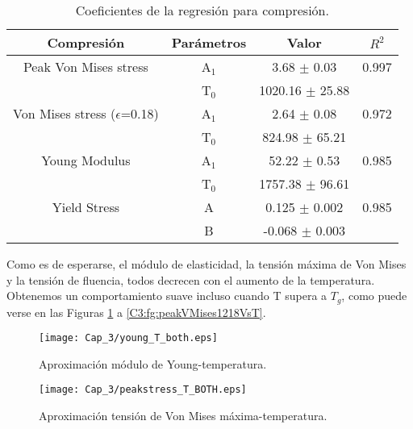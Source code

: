 \begin{table}[htp]
\begin{center}
\begin{tabular}{*{4}{c}}
\hline
\textbf{Compresión} & Parámetros & Valor & $R^{2}$ \\ \hline \hline
Peak Von Mises stress & A$_{1}$ & 3.68 $\pm$ 0.03 & 0.997 \\
 & T$_{0}$ & 1020.16 $\pm$ 25.88 & \\ \hline
Von Mises stress ($\epsilon$=0.18) & A$_{1}$ & 2.64 $\pm$ 0.08 & 0.972 \\
 & T$_{0}$ & 824.98 $\pm$ 65.21 & \\ \hline
Young Modulus & A$_{1}$ & 52.22 $\pm$ 0.53 & 0.985 \\
 & T$_{0}$ & 1757.38 $\pm$ 96.61 & \\ \hline
Yield Stress & A & 0.125 $\pm$ 0.002 & 0.985 \\
 & B & -0.068 $\pm$ 0.003 & \\ \hline
\end{tabular}
\end{center}
\caption[Coeficientes de la regresión para compresión]{Coeficientes de la regresión para compresión.}
\label{C3:tb:initPropsComp}
\end{table}

Como es de esperarse, el módulo de elasticidad, la tensión máxima de Von Mises y la tensión de fluencia, todos decrecen con el aumento de la temperatura. Obtenemos un comportamiento suave incluso cuando T supera a $T_g$, como puede verse en las Figuras \ref{C3:fg:youngVsT} a \ref{C3:fg:peakVMises1218VsT}.


\begin{figure}[htp]
\centering
\texttt{[image: Cap\_3/young\_T\_both.eps]}
\caption[Aproximación módulo de Young-temperatura]{Aproximación módulo de Young-temperatura.}
\label{C3:fg:youngVsT}
\end{figure}

\begin{figure}[htp]
\centering
\texttt{[image: Cap\_3/peakstress\_T\_BOTH.eps]}
\caption[Aproximación tensión de Von Mises máxima-temperatura]{Aproximación tensión de Von Mises máxima-temperatura.}
\label{C3:fg:peakVMisesVsT}
\end{figure}

